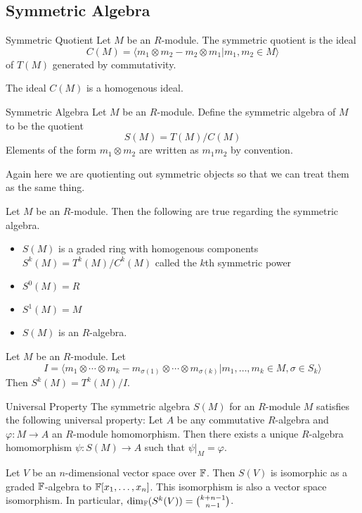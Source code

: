 \documentclass[a4paper]{article}
\begin{document}
\subsection{Symmetric Algebra}
\begin{defn}{Symmetric Quotient}{} Let $M$ be an $R$-module. The symmetric quotient is the ideal $$C(M)=\langle m_1\otimes m_2-m_2\otimes m_1|m_1,m_2\in M\rangle$$ of $T(M)$ generated by commutativity. 
\end{defn}

\begin{lmm}{}{} The ideal $C(M)$ is a homogenous ideal. 
\end{lmm}

\begin{defn}{Symmetric Algebra}{} Let $M$ be an $R$-module. Define the symmetric algebra of $M$ to be the quotient $$S(M)=T(M)/C(M)$$ Elements of the form $m_1\otimes m_2$ are written as $m_1m_2$ by convention. 
\end{defn}

Again here we are quotienting out symmetric objects so that we can treat them as the same thing. 

\begin{prp}{}{} Let $M$ be an $R$-module. Then the following are true regarding the symmetric algebra. 
\begin{itemize}
\item $S(M)$ is a graded ring with homogenous components $S^k(M)=T^k(M)/C^k(M)$ called the $k$th symmetric power
\item $S^0(M)=R$
\item $S^1(M)=M$
\item $S(M)$ is an $R$-algebra. 
\end{itemize}
\end{prp}

\begin{thm}{}{} Let $M$ be an $R$-module. Let $$I=\langle m_1\otimes\cdots\otimes m_k-m_{\sigma(1)}\otimes\cdots\otimes m_{\sigma(k)}|m_1,\dots,m_k\in M, \sigma\in S_k\rangle$$ Then $S^k(M)=T^k(M)/I$. 
\end{thm}

\begin{thm}{Universal Property}{} The symmetric algebra $S(M)$ for an $R$-module $M$ satisfies the following universal property: Let $A$ be any commutative $R$-algebra and $\varphi:M\to A$ an $R$-module homomorphism. Then there exists a unique $R$-algebra homomorphism $\psi:S(M)\to A$ such that $\psi|_M=\varphi$. 
\end{thm}

\begin{crl}{}{} Let $V$ be an $n$-dimensional vector space over $\mathbb{F}$. Then $S(V)$ is isomorphic as a graded $\mathbb{F}$-algebra to $\mathbb{F}[x_1,\dots,x_n]$. This isomorphism is also a vector space isomorphism. In particular, $\dim_{\mathbb{F}}(S^k(V))=\binom{k+n-1}{n-1}$. 
\end{crl}
\end{document}
